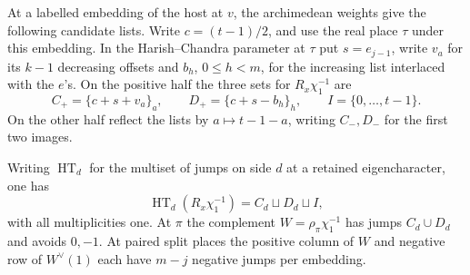 At a labelled embedding of the host at \(v\), the archimedean
weights give the following candidate lists. Write \(c=(t-1)/2\), and use the real place \(\tau\)
under this embedding. In the Harish--Chandra parameter at
\(\tau\) put \(s=e_{j-1}\), write \(v_a\) for its \(k-1\)
decreasing offsets and \(b_h\), \(0\le h<m\), for the
increasing list interlaced with the \(e\)'s. On the positive
half the three sets for \(R_x\chi_1^{-1}\) are
\[
 C_+=\{c+s+v_a\}_a,\qquad D_+=\{c+s-b_h\}_h,\qquad
 I=\{0,\ldots,t-1\}.
\]
On the other half reflect the lists by \(a\mapsto t-1-a\),
writing \(C_-,D_-\) for the first two images.

\begin{lemma}
\label{lem:marked-signed-jumps}
Writing \(\operatorname{HT}_d\) for the multiset of jumps on side \(d\) at a retained eigencharacter, one has
\[
 \operatorname{HT}_d(R_x\chi_1^{-1})=C_d\sqcup D_d\sqcup I,
\]
with all multiplicities one. At \(\pi\) the complement \(W=\rho_\pi\chi_1^{-1}\)
has jumps \(C_d\cup D_d\) and avoids \(0,-1\). At paired split
places the positive column of \(W\) and negative row of
\(W^\vee(1)\) each have \(m-j\) negative jumps per embedding.
\end{lemma}

